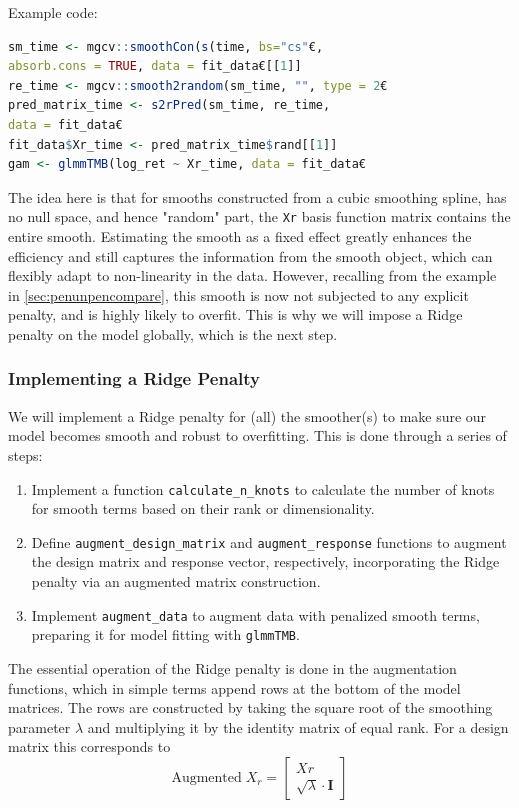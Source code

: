 \documentclass[12pt, twoside,hidelinks]{article}
\theoremstyle{definition}
\numberwithin{equation}{section}
\begin{document}
Example code:

\begin{lstlisting}[language=R]
sm_time <- mgcv::smoothCon(s(time, bs="cs"€, 
absorb.cons = TRUE, data = fit_data€[[1]]
re_time <- mgcv::smooth2random(sm_time, "", type = 2€
pred_matrix_time <- s2rPred(sm_time, re_time, 
data = fit_data€
fit_data$Xr_time <- pred_matrix_time$rand[[1]]
gam <- glmmTMB(log_ret ~ Xr_time, data = fit_data€
\end{lstlisting}

The idea here is that for smooths constructed from a cubic smoothing spline, has no null space, and hence "random" part, the \texttt{Xr} basis function matrix contains the entire smooth. Estimating the smooth as a fixed effect greatly enhances the efficiency and still captures the information from the smooth object, which can flexibly adapt to non-linearity in the data. However, recalling from the example in \ref{sec:penunpencompare}, this smooth is now not subjected to any explicit penalty, and is highly likely to overfit. This is why we will impose a Ridge penalty on the model globally, which is the next step.

\subsubsection{Implementing a Ridge Penalty}

We will implement a Ridge penalty for (all) the smoother(s) to make sure our model becomes smooth and robust to overfitting. This is done through a series of steps:

\begin{enumerate}
    \item Implement a function \texttt{calculate\_n\_knots} to calculate the number of knots for smooth terms based on their rank or dimensionality.
    \item Define \texttt{augment\_design\_matrix} and \texttt{augment\_response} functions to augment the design matrix and response vector, respectively, incorporating the Ridge penalty via an augmented matrix construction.
    \item Implement \texttt{augment\_data} to augment data with penalized smooth terms, preparing it for model fitting with \texttt{glmmTMB}.
\end{enumerate}

The essential operation of the Ridge penalty is done in the augmentation functions, which in simple terms append rows at the bottom of the model matrices. The rows are constructed by taking the square root of the smoothing parameter $\lambda$ and multiplying it by the identity matrix of equal rank. For a design matrix this corresponds to 
\begin{equation}
\text{Augmented}\; X_r = \left[\begin{array}{cc}
     Xr \\
     \sqrt{\lambda} \cdot \mathbf{I} 
\end{array}\right]    
\end{equation}
\end{document}
